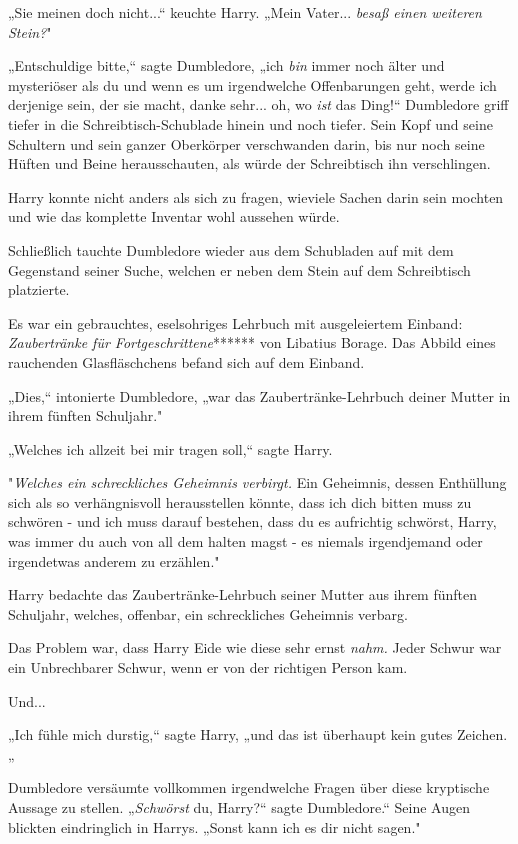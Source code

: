 {„Sie meinen doch nicht...“ keuchte Harry. „Mein Vater... \emph{besaß einen weiteren Stein?}"

„Entschuldige bitte,“ sagte Dumbledore, „ich \emph{bin} immer noch älter und mysteriöser als du und wenn es um irgendwelche Offenbarungen geht, werde ich derjenige sein, der sie macht, danke sehr... oh, wo \emph{ist} das Ding!“ Dumbledore griff tiefer in die Schreibtisch-Schublade hinein und noch tiefer. Sein Kopf und seine Schultern und sein ganzer Oberkörper verschwanden darin, bis nur noch seine Hüften und Beine herausschauten, als würde der Schreibtisch ihn verschlingen.

Harry konnte nicht anders als sich zu fragen, wieviele Sachen darin sein mochten und wie das komplette Inventar wohl aussehen würde.

Schließlich tauchte Dumbledore wieder aus dem Schubladen auf mit dem Gegenstand seiner Suche, welchen er neben dem Stein auf dem Schreibtisch platzierte.

Es war ein gebrauchtes, eselsohriges Lehrbuch mit ausgeleiertem Einband: \emph{Zaubertränke für Fortgeschrittene}****** von Libatius Borage. Das Abbild eines rauchenden Glasfläschchens befand sich auf dem Einband.

„Dies,“ intonierte Dumbledore, „war das Zaubertränke-Lehrbuch deiner Mutter in ihrem fünften Schuljahr."

„Welches ich allzeit bei mir tragen soll,“ sagte Harry.

"\emph{Welches ein schreckliches Geheimnis verbirgt.} Ein Geheimnis, dessen Enthüllung sich als so verhängnisvoll herausstellen könnte, dass ich dich bitten muss zu schwören - und ich muss darauf bestehen, dass du es aufrichtig schwörst, Harry, was immer du auch von all dem halten magst - es niemals irgendjemand oder irgendetwas anderem zu erzählen."

Harry bedachte das Zaubertränke-Lehrbuch seiner Mutter aus ihrem fünften Schuljahr, welches, offenbar, ein schreckliches Geheimnis verbarg.

Das Problem war, dass Harry Eide wie diese sehr ernst \emph{nahm.} Jeder Schwur war ein Unbrechbarer Schwur, wenn er von der richtigen Person kam.

Und...

„Ich fühle mich durstig,“ sagte Harry, „und das ist überhaupt kein gutes Zeichen.„

Dumbledore versäumte vollkommen irgendwelche Fragen über diese kryptische Aussage zu stellen. „\emph{Schwörst} du, Harry?“ sagte Dumbledore.“ Seine Augen blickten eindringlich in Harrys. „Sonst kann ich es dir nicht sagen."

}
